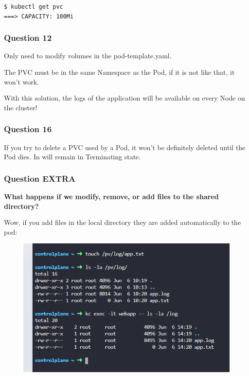 \documentclass{article}
\newenvironment{blocktemplateII}[1]{%
    \tcolorbox[beamer,%
    noparskip,breakable,
    colframe=Green,%
    colbacklower=LimeGreen!75!LightGreen,%
    title=#1]}%
    {\endtcolorbox}
\newenvironment{blocktemplateIII}[1]{%
    \tcolorbox[beamer,%
    noparskip,breakable,
    ,colframe=Red,%
    colbacklower=LimeGreen!75!LightGreen,%
    title=#1]}%
    {\endtcolorbox}
\newenvironment{codetemplate}[1][]{%
  \mybasecolorbox[#1]
  \itshape
}{%
  \endmybasecolorbox
}
\begin{document}
\begin{codetemplate}{}
\begin{verbatim}
$ kubectl get pvc
===> CAPACITY: 100Mi
\end{verbatim}
\end{codetemplate}

\subsubsection{Question 12}

Only need to modify volumes in the pod-template.yaml.

\begin{blocktemplateIII}{WARNING}
The PVC must be in the same Namespace as the Pod, if it is not like that, it won't work.
\end{blocktemplateIII}

\begin{blocktemplateII}{IMPORTANT}
With this solution, the logs of the application will be available on every Node on the cluster!
\end{blocktemplateII}

\subsubsection{Question 16}

\begin{blocktemplateIII}{WARNING}
If you try to delete a PVC used by a Pod, it won't be definitely deleted until the Pod dies. In will remain in Terminating state.
\end{blocktemplateIII}


\subsubsection{Question EXTRA}

\textbf{What happens if we modify, remove, or add files to the shared directory?}

Wow, if you add files in the local directory they are added automatically to the pod:

\begin{figure}[H]
    \includegraphics[width=\textwidth]{pictures/wow.png}
\end{figure}
\end{document}
